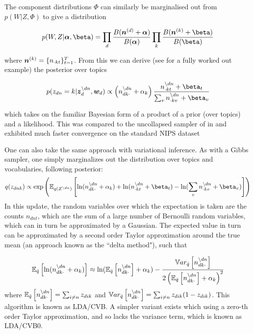 The component distributions $\Phi$ can similarly be marginalised out from $p(W|Z,
\Phi)$ to give a distribution

\begin{align}
p(W,Z|\vv{\alpha},\vv{\beta}) = \prod_d \frac{B(\vv{n}^{(d)} + \vv{\alpha})}{B(\vv{\alpha})} \prod_k \frac{B(\vv{n}^{(k)} + \vv{\beta})}{B(\vv{\beta})}
\end{align}

where $\vv{n}^{(k)} = \{ n_{\cdot kt} \}_{t=1}^T$. From this we can derive (see \cite{Heinrich2005} for a fully worked out example) the posterior over topics

\begin{align}
p(z_{dn} = k | \vv{z}_{d}^{\setminus dn}, \vv{w}_d)
\propto
\left(n_{dk\cdot}^{\setminus dn} + \alpha_k \right)
\frac{n_{\cdot kt}^{\setminus dn} + \beta_t}{\sum_v n_{\cdot kv}^{\setminus dn} + \beta_v}
\end{align}

which takes on the familiar Bayesian form of a product of a prior (over topics) and a likelihood. This was compared to the uncollapsed sampler of \cite{Pritchard2000} in \cite{Newman2009} and exhibited much faster convergence on the standard NIPS dataset

One can also take the same approach with variational inference. As with a Gibbs sampler, one simply marginalizes out the distribution over topics and vocabularies, following posterior\cite{Teh2007}:
\begin{equation}
q(\zdnk) \propto \exp\left(\ex{
    \ln (n_{dk\cdot}^{\setminus dn} + \alpha_k ) 
    + \ln (n_{\cdot kt}^{\setminus dn} + \beta_t)
    - \ln (\sum_v n_{\cdot kv}^{\setminus dn} + \beta_v)}{q(Z^{\setminus dn})}
\right)
\end{equation}
In this update, the random variables over which the expectation is taken are the counts $n_{dnt}$, which are the sum of a large number of Bernoulli random variables, which can in turn be approximated by a Gaussian. The expected value in turn can be approximated by a second order Taylor approximation around the true mean (an approach known as the ``delta method"\cite{Wang2013}), such that

\begin{align}
\ex{\ln (n_{dk\cdot}^{\setminus dn} + \alpha_k )}{\hat{q}} 
\approx 
\ln (\ex{n_{dk\cdot}^{\setminus dn}}{\hat{q}} + \alpha_k ) - \frac{\var{n_{dk\cdot}^{\setminus dn}}{\hat{q}}}{2\left( \ex{n_{dk\cdot}^{\setminus dn}}{\hat{q}} + \alpha_k \right)^2}
\end{align}
where $\ex{n_{dk\cdot}^{\setminus dn}}{\hat{q}} = \sum_{i \neq n} z_{dik}$ and $\var{n_{dk\cdot}^{\setminus dn}}{\hat{q}} = \sum_{i \neq n} z_{dik}(1 - z_{dik})$. This algorithm is known as LDA/CVB. A simpler variant exists which using a zero-th order Taylor approximation, and so lacks the variance term, which is known as LDA/CVB0.\cite{Asuncion2012} 


